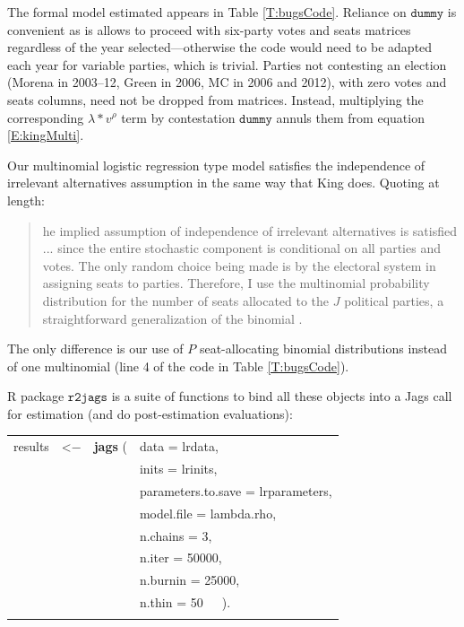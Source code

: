 \documentclass[letter,12pt]{article}
\begin{document}
The formal model estimated appears in Table \ref{T:bugsCode}. Reliance on $\texttt{dummy}$ is convenient as is allows to proceed with six-party votes and seats matrices regardless of the year selected---otherwise the code would need to be adapted each year for variable parties, which is trivial. Parties not contesting an election (Morena in 2003--12, Green in 2006, MC in 2006 and 2012), with zero votes and seats columns, need not be dropped from matrices. Instead, multiplying the corresponding $\lambda * v^\rho$ term by contestation $\texttt{dummy}$ annuls them from equation \ref{E:kingMulti}. 

Our multinomial logistic regression type model satisfies the independence of irrelevant alternatives assumption in the same way that King does. Quoting at length: 
\begin{quotation} 
\singlespacing
\noindent [T]he implied assumption of independence of irrelevant alternatives is satisfied ... since the entire stochastic component is conditional on all parties and votes. The only random choice being made is by the electoral system in assigning seats to parties. Therefore, I use the multinomial probability distribution for the number of seats allocated to the $J$ political parties, a straightforward generalization of the binomial \citep[][:168]{king.1990elRespBiasMultiparty}.
\end{quotation} 
The only difference is our use of $P$ seat-allocating binomial distributions instead of one multinomial (line 4 of the code in Table \ref{T:bugsCode}).

R package $\texttt{r2jags}$ \citep{r.r2jags} is a suite of functions to bind all these objects into a Jags call for estimation (and do post-estimation evaluations):

\begin{center}
\begin{tabular}{ll}
\\
results~~<$-$~~\textbf{jags} ( & data = lrdata, \\ 
                  & inits = lrinits, \\
                  & parameters.to.save = lrparameters, \\
                  & model.file = lambda.rho, \\
                  & n.chains = 3, \\
                  & n.iter = 50000, \\
                  & n.burnin = 25000, \\
                  & n.thin = 50~~~). \\ \\
\end{tabular}
\end{center}
\end{document}
